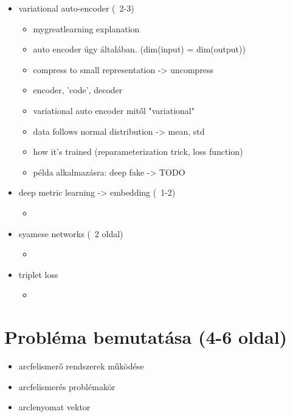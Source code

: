 \begin{itemize}
	\item variational auto-encoder (~2-3)
	\begin{itemize}
		\item mygreatlearning explanation
		\item auto encoder úgy általában. (dim(input) = dim(output))
		\item compress to small representation -> uncompress
		\item encoder, 'code', decoder
		\item variational auto encoder mitől "variational"
		\item data follows normal distribution -> mean, std
		\item how it's trained (reparameterization trick, loss function)
		\item példa alkalmazásra: deep fake -> TODO
	\end{itemize}

	\item deep metric learning -> embedding (~1-2)
	\begin{itemize}
		\item 
	\end{itemize}
	\item syamese networks (~2 oldal)
	\begin{itemize}
		\item 
	\end{itemize}
	\item triplet loss
	\begin{itemize}
		\item 
	\end{itemize}
\end{itemize}

\section{Probléma bemutatása (4-6 oldal)} 
\begin{itemize}
	\item arcfelismerő rendszerek működése
	\item arcfelismerés problémakör
	\item arclenyomat vektor
\end{itemize}

